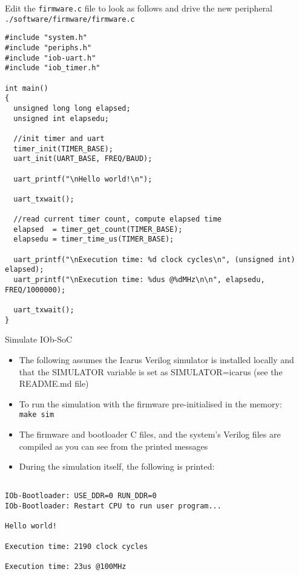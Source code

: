 \documentclass [xcolor=svgnames, t] {beamer}
\begin{document}
\begin{frame}[fragile]{Edit the {\tt firmware.c} file to look as follows and drive the new peripheral}
  {\tt ./software/firmware/firmware.c}
  \begin{tiny}
    \begin{lstlisting}
#include "system.h"
#include "periphs.h"
#include "iob-uart.h"
#include "iob_timer.h"

int main()
{
  unsigned long long elapsed;
  unsigned int elapsedu;

  //init timer and uart
  timer_init(TIMER_BASE);
  uart_init(UART_BASE, FREQ/BAUD);

  uart_printf("\nHello world!\n");
  
  uart_txwait();

  //read current timer count, compute elapsed time
  elapsed  = timer_get_count(TIMER_BASE);
  elapsedu = timer_time_us(TIMER_BASE);

  uart_printf("\nExecution time: %d clock cycles\n", (unsigned int) elapsed);
  uart_printf("\nExecution time: %dus @%dMHz\n\n", elapsedu, FREQ/1000000);

  uart_txwait();
}
    \end{lstlisting}
  \end{tiny}
\end{frame}


\begin{frame}[fragile]{Simulate IOb-SoC}
\begin{itemize}
\item The following assumes the Icarus Verilog simulator is installed locally and that the SIMULATOR variable is set as SIMULATOR=icarus (see the README.md file)
\item To run the simulation with the firmware pre-initialised in the memory:\\
  {\tt make sim}
\item The firmware and bootloader C files, and the system's Verilog files are compiled as you can see from the printed messages
\item During the simulation itself, the following is printed:
\end{itemize}

\begin{tiny}
  \begin{lstlisting}

IOb-Bootloader: USE_DDR=0 RUN_DDR=0
IOb-Bootloader: Restart CPU to run user program...

Hello world!

Execution time: 2190 clock cycles

Execution time: 23us @100MHz

  \end{lstlisting}
\end{tiny}
\end{frame}
\end{document}
